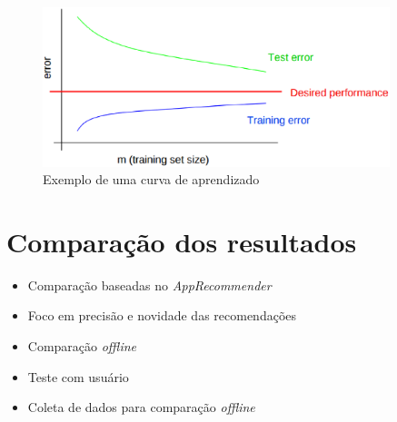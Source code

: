 \begin{frame}

\begin{figure}[h]
  \centering
  \includegraphics[width=0.9\textwidth]{figura/curva_aprendizado.eps}
  \caption{Exemplo de uma curva de aprendizado}
  \label{fig:curva_aprendizado}
\end{figure}

\end{frame}


\label{sec:aprendizado_maquina}

\section{Comparação dos resultados} %
\label{sec:comparacao_resultados}

\begin{frame}
    \begin{itemize}
        \item Comparação baseadas no \textit{AppRecommender}
        \item Foco em precisão e novidade das recomendações
        \item Comparação \textit{offline}
        \item Teste com usuário
        \item Coleta de dados para comparação \textit{offline}
    \end{itemize}
\end{frame}

